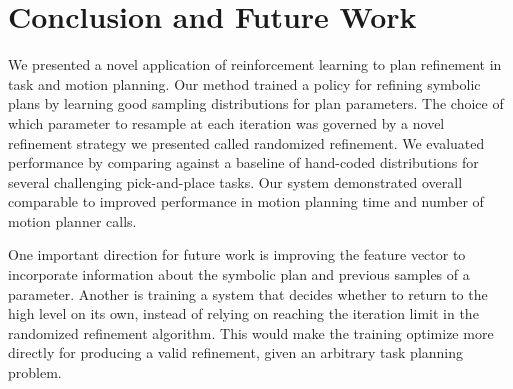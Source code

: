 \section{Conclusion and Future Work}
We presented a novel application of reinforcement learning to plan refinement in task
and motion planning. Our method trained a policy for refining symbolic plans
by learning good sampling distributions for plan parameters. The choice
of which parameter to resample at each iteration was governed by a novel
refinement strategy we presented called randomized refinement. We evaluated
performance by comparing against a baseline of hand-coded distributions
for several challenging pick-and-place tasks. Our system demonstrated overall comparable
to improved performance in motion planning time and number of motion planner calls.

One important direction for future work is improving the feature vector to incorporate
information about the symbolic plan and previous samples of a parameter.
Another is training a system that decides
whether to return to the high level on its own, instead of relying on
reaching the iteration limit in the randomized refinement algorithm. This would
make the training optimize more directly for producing a valid refinement,
given an arbitrary task planning problem.